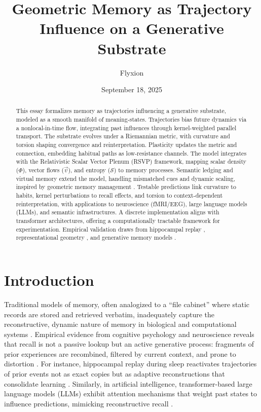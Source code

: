 \documentclass[a4paper,12pt]{article}
\newcommand{\Scal}{\mathcal{S}}
\newcommand{\vvec}{\vec{v}}
\begin{document}
\title{Geometric Memory as Trajectory Influence on a Generative Substrate}
\author{Flyxion}
\date{September 18, 2025}
\maketitle

\begin{abstract}
This essay formalizes memory as trajectories influencing a generative substrate, modeled as a smooth manifold of meaning-states. Trajectories bias future dynamics via a nonlocal-in-time flow, integrating past influences through kernel-weighted parallel transport. The substrate evolves under a Riemannian metric, with curvature and torsion shaping convergence and reinterpretation. Plasticity updates the metric and connection, embedding habitual paths as low-resistance channels. The model integrates with the Relativistic Scalar Vector Plenum (RSVP) framework, mapping scalar density ($\Phi$), vector flows ($\vvec$), and entropy ($\Scal$) to memory processes. Semantic ledging and virtual memory extend the model, handling mismatched cues and dynamic scaling, inspired by geometric memory management \citep{kuijper2021geometric}. Testable predictions link curvature to habits, kernel perturbations to recall effects, and torsion to context-dependent reinterpretation, with applications to neuroscience (fMRI/EEG), large language models (LLMs), and semantic infrastructures. A discrete implementation aligns with transformer architectures, offering a computationally tractable framework for experimentation. Empirical validation draws from hippocampal replay \citep{oliver2017hippocampal}, representational geometry \citep{edelman1998representation}, and generative memory models \citep{ritter2023generative}.
\end{abstract}

\tableofcontents

\section{Introduction}
Traditional models of memory, often analogized to a ``file cabinet'' where static records are stored and retrieved verbatim, inadequately capture the reconstructive, dynamic nature of memory in biological and computational systems \citep{mcclelland1995why}. Empirical evidence from cognitive psychology and neuroscience reveals that recall is not a passive lookup but an active generative process: fragments of prior experiences are recombined, filtered by current context, and prone to distortion \citep{ritter2023generative}. For instance, hippocampal replay during sleep reactivates trajectories of prior events not as exact copies but as adaptive reconstructions that consolidate learning \citep{oliver2017hippocampal}. Similarly, in artificial intelligence, transformer-based large language models (LLMs) exhibit attention mechanisms that weight past states to influence predictions, mimicking reconstructive recall \citep{vaswani2017attention}.
\end{document}
